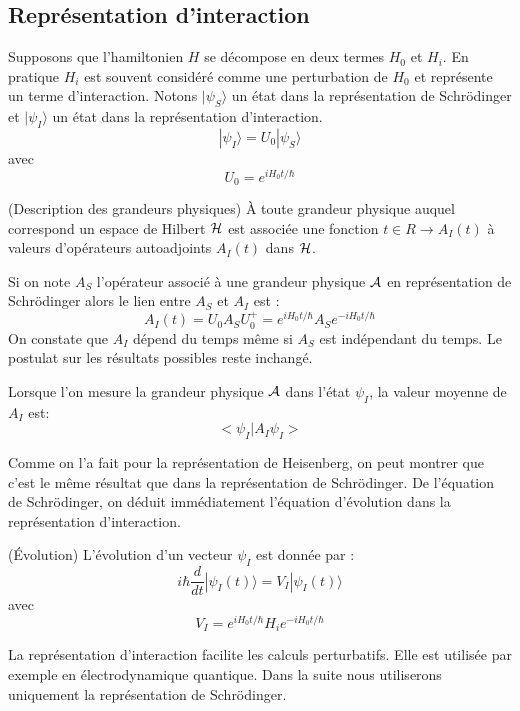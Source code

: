 \documentclass[12pt]{book}
\begin{document}
\subsection{Repr\'esentation d'interaction}
Supposons que l'hamiltonien $H$ se d\'ecompose en deux termes $H_0$ et
$H_i$. En pratique $H_i$ est souvent consid\'er\'e comme une perturbation
de $H_0$ et repr\'esente un terme d'interaction.
Notons $|\psi_S\rangle $ un \'etat dans la repr\'esentation de
Schr\"odinger et 
$|{\psi}_I\rangle $ un \'etat dans la repr\'esentation
d'interaction.
\begin{equation}
|{\psi}_I\rangle =U_0|\psi_S\rangle
\end{equation}
avec 
\begin{equation}
U_0=e^{iH_0t/\hbar}
\end{equation}
\begin{postulat}(Description des grandeurs physiques)
\`A toute grandeur physique auquel correspond un espace de Hilbert
${\cal H}$ est associ\'ee une fonction $t\in R\rightarrow A_I(t)$ \`a
valeurs d'op\'erateurs autoadjoints $A_I(t)$ dans ${\cal H}$.
\end{postulat}
Si on note $A_S$ l'op\'erateur associ\'e \`a une grandeur physique
$\cal A$ en repr\'esentation de Schr\"odinger alors le lien entre $A_S$
et $A_I$ est :
\begin{equation}
A_I(t)=U_0A_SU_0^+=e^{iH_0t/\hbar}A_S e^{-iH_0t/\hbar}
\end{equation}
On constate que $A_I$ d\'epend du temps m\^eme si $A_S$ est
ind\'ependant du temps.
Le postulat sur les r\'esultats possibles reste inchang\'e.
\begin{postulat}
Lorsque l'on mesure la grandeur physique $\cal A$ dans l'\'etat $\psi_I$,
la valeur moyenne de $A_I$ est:
\begin{equation}
<\psi_I|A_I\psi_I>
\end{equation}
\end{postulat}
Comme on l'a fait pour la repr\'esentation de Heisenberg, on peut
montrer que c'est le m\^eme r\'esultat que dans la repr\'esentation de
Schr\"odinger.
De l'\'equation de Schr\"odinger, on d\'eduit imm\'ediatement l'\'equation
d'\'evolution dans la repr\'esentation d'interaction.
\begin{postulat}(\'Evolution)
L'\'evolution d'un vecteur $\psi_I$ est donn\'ee par :
\begin{equation}
i\hbar \frac{d}{dt} |\psi_I(t)\rangle
= V_I|\psi_I(t)\rangle  
\end{equation}
avec
\begin{equation}
V_I=e^{iH_0t/\hbar}H_ie^{-iH_0t/\hbar}
\end{equation}
\end{postulat}
La repr\'esentation d'interaction facilite les calculs perturbatifs.
Elle est utilis\'ee par exemple en \'electrodynamique
quantique\cite{ph:mecaq:Cohen88}.
Dans la suite nous utiliserons uniquement la repr\'esentation de
Schr\"odinger.
\end{document}
